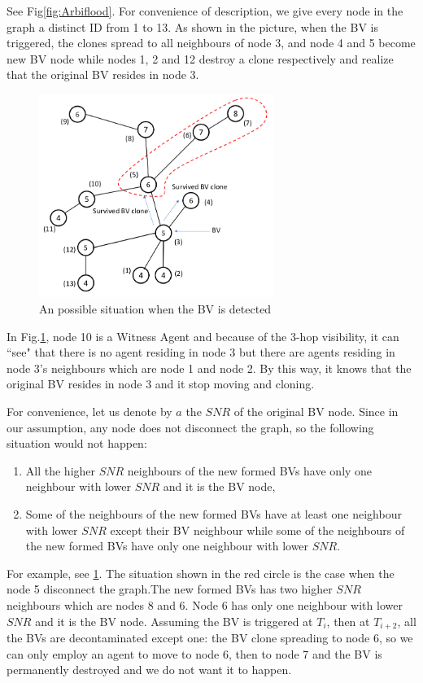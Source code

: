 See Fig\ref{fig:Arbiflood}. For convenience of description, we give every node in the graph a distinct ID from 1 to 13. As shown in the picture, when the BV is triggered, the clones spread to all neighbours of node 3, and node 4 and 5 become new BV node while nodes 1, 2 and 12 destroy a clone respectively and realize that the original BV resides in node 3.

\begin{figure}[H]
  \centering  
  \includegraphics[width=3in]{figures/Arbi3.png}
  \caption{An possible situation when the BV is detected}\label{fig:Arbi3}
\end{figure} 

In Fig.\ref{fig:Arbi3}, node 10 is a Witness Agent and because of the 3-hop visibility, it can ``see" that there is no agent residing in node 3 but there are agents residing in node 3's neighbours which are node 1 and node 2. By this way, it knows that the original BV resides in node 3 and it stop moving and cloning.

For convenience, let us denote by $a$ the $SNR$ of the original BV node. Since in our assumption, any node does not disconnect the graph, so the following situation would not happen:
\begin{enumerate}
\item All the higher $SNR$ neighbours of the new formed BVs have only one neighbour with lower $SNR$ and it is the BV node, \item Some of the neighbours of the new formed BVs have at least one neighbour with lower $SNR$ except their BV neighbour while some of the neighbours of the new formed BVs have only one neighbour with lower $SNR$.
\end{enumerate}
For example, see \ref{fig:Arbi3}. The situation shown in the red circle is the case when the node 5 disconnect the graph.The new formed BVs has two higher $SNR$ neighbours which are nodes 8 and 6. Node 6 has only one neighbour with lower $SNR$ and it is the BV node. Assuming the BV is triggered at $T_i$, then at $T_{i+2}$, all the BVs are decontaminated except one: the BV clone spreading to node 6, so we can only employ an agent to move to node 6, then to node 7 and the BV is permanently destroyed and we do not want it to happen.

